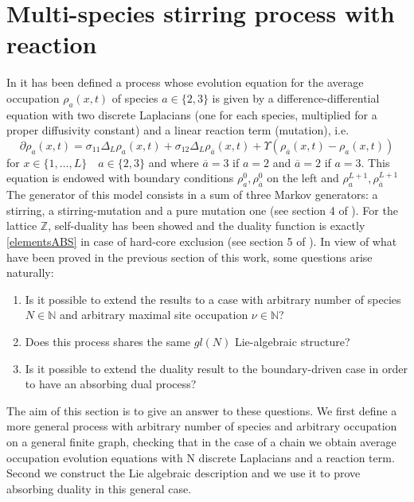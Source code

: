 \documentclass[11pt]{article}
\numberwithin{equation}{section}
\numberwithin{equation}{subsection}
\begin{document}
\section{Multi-species stirring process with reaction}
In \cite{casini2022uphill} it has been defined a process whose evolution equation for the average occupation $\rho_{a}(x,t)$ of species $a\in \{2,3\}$ is given by a difference-differential equation with two discrete Laplacians (one for each species, multiplied for a proper diffusivity constant) and a linear reaction term (mutation), i.e.
\begin{equation}\label{2SpeciesRD}
	\partial \rho_{a}(x,t)=\sigma_{11}\Delta_{L}\rho_{a}(x,t)+\sigma_{12}\Delta_{L}\rho_{\overline{a}}(x,t)+\Upsilon\left(\rho_{\overline{a}}(x,t)-\rho_{a}(x,t)\right)
\end{equation} 
for $ x\in\{1,\ldots,L\}\quad a\in\{2,3\}$  and where $\overline{a}=3$ if $a=2$ and $\overline{a}=2$ if $a=3$.
This equation is endowed with boundary conditions $\rho_{a}^{0},\rho_{\overline{a}}^{0}$ on the left and $\rho_{a}^{L+1},\rho_{\overline{a}}^{L+1}$ \\The generator of this model consists in a sum of three Markov generators: a stirring, a stirring-mutation and a pure mutation one (see section 4 of \cite{casini2022uphill}). For the lattice $\mathbb{Z}$, self-duality has been showed and the duality function is exactly \eqref{elementsABS} in case of hard-core exclusion (see section 5 of \cite{casini2022uphill}). In view of what have been proved in the previous section of this work, some questions arise naturally:
\begin{enumerate}
		\item Is it possible to extend the results to a case with arbitrary number of species $N\in \mathbb{N}$ and arbitrary maximal site occupation $\nu\in \mathbb{N}$?
			\item Does this process shares the same $gl(N)$ Lie-algebraic structure?
	\item Is it possible to extend the duality result to the boundary-driven case in order to have an absorbing dual process?
\end{enumerate}
The aim of this section is to give an answer to these questions. We first define a more general process with arbitrary number of species and arbitrary occupation on a general finite graph, checking that in the case of a chain we obtain average occupation evolution equations with N discrete Laplacians and a reaction term. Second we construct the Lie algebraic description and we use it to prove absorbing duality in this general case. 
\end{document}
